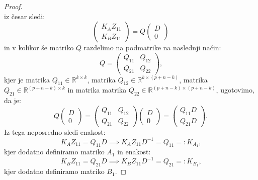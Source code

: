 \documentclass[mat1]{article}
\begin{document}
\begin{proof}
\begin{equation}
\end{equation}
iz česar sledi:
$$
\begin{pmatrix}
K_A Z_{11} \\ 
K_B Z_{11}
\end{pmatrix} = Q
\begin{pmatrix}
D \\ 
0
\end{pmatrix}
$$ in v kolikor še matriko $Q$ razdelimo na podmatrike na naslednji način:
$$ Q = 
\begin{pmatrix}
Q_{11} & Q_{12} \\ 
Q_{21} & Q_{22}
\end{pmatrix} \text{,}
$$ kjer je matrika $Q_{11} \in \mathbb{R}^{k \times k}$, matrika $Q_{12} \in \mathbb{R}^{k \times (p+n-k)}$, matrika $Q_{21} \in \mathbb{R}^{ (p+n-k) \times k}$ in matrika matrika $Q_{22} \in \mathbb{R}^{ (p+n-k) \times (p+n-k)}$, ugotovimo, da je:
$$Q
\begin{pmatrix}
D \\ 
0
\end{pmatrix} = 
\begin{pmatrix}
Q_{11} & Q_{12} \\ 
Q_{21} & Q_{22}
\end{pmatrix}
\begin{pmatrix}
D \\ 
0
\end{pmatrix} =
\begin{pmatrix}
Q_{11} D \\ 
Q_{21} D
\end{pmatrix} \text{.}
$$
Iz tega neposredno sledi enakost:
$$
K_A Z_{11} = Q_{11} D \implies K_A Z_{11} D^{-1} = Q_{11} =: K_{A_1} \text{,}
$$ kjer dodatno definiramo matriko $A_1$
in enakost:
$$
K_B Z_{11} = Q_{21} D \implies K_B Z_{11} D^{-1} = Q_{21} =: K_{B_1} \text{,}
$$ kjer dodatno definiramo matriko $B_1$.


\end{proof}
\end{document}
